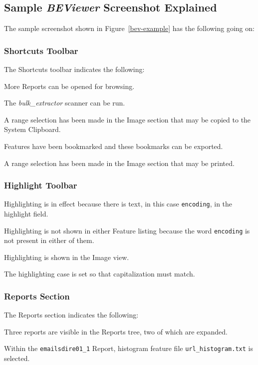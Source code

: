\documentclass[10pt,twoside]{article}
\newcommand{\bulk}{\emph{bulk\_extractor}\xspace}
\newcommand{\bev}{\emph{BEViewer}\xspace}
\begin{document}
\subsection{Sample \bev Screenshot Explained}
The sample screenshot shown in Figure~\ref{bev-example} has the following going on:
\subsubsection{Shortcuts Toolbar}
The Shortcuts toolbar indicates the following:
\begin{compactitem}
\item More Reports can be opened for browsing.
\item The \bulk scanner can be run.
\item A range selection has been made in the Image section
that may be copied to the System Clipboard.
\item Features have been bookmarked and these bookmarks can be exported.
\item A range selection has been made in the Image section that may be printed.
\end{compactitem}
\subsubsection{Highlight Toolbar}
Highlighting is in effect because there is text, in this case \texttt{encoding},
in the highlight field.
\begin{compactitem}
\item Highlighting is not shown in either Feature listing
because the word \texttt{encoding} is not present in either of them.
\item Highlighting is shown in the Image view.
\item The highlighting case is set so that capitalization must match.
\end{compactitem}
\subsubsection{Reports Section}
The Reports section indicates the following:
\begin{compactitem}
\item Three reports are visible in the Reports tree, two of which are expanded.
\item Within the \texttt{emailsdire01\_1} Report,
histogram feature file \texttt{url\_histogram.txt} is selected.
\end{compactitem}
\end{document}
